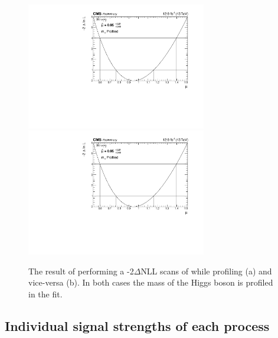 \begin{figure}[ht!]
\centering
\includegraphics[width=0.7\textwidth]{statandresultsFigures/MuScanProfileMH.pdf} \\
\includegraphics[width=0.7\textwidth]{statandresultsFigures/MuScanProfileMH.pdf} 
\caption{The result of performing a -2$\Delta$NLL scans of \muF while profiling \muV (a) and vice-versa (b). In both cases the mass of the Higgs boson is profiled in the fit. }

\label{fig:statandresults:mu_per_rv_and_rf}

\end{figure}

\subsection{Individual signal strengths of each process}

